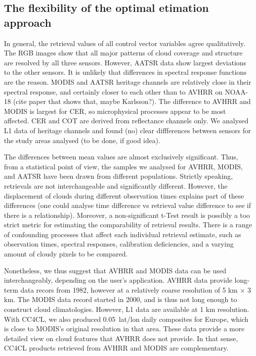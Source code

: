 \label{conclusions}

\subsection{The flexibility of the optimal etimation approach}


In general, the retrieval values of all control vector variables agree qualitatively. The RGB images show that all major patterns of cloud coverage and structure are resolved by all three sensors. However, AATSR data show largest deviations to the other sensors. It is unlikely that differences in spectral response functions are the reason. MODIS and AATSR heritage channels are relatively close in their spectral response, and certainly closer to each other than to AVHRR on NOAA-18 (cite paper that shows that, maybe Karlsson?). The difference to AVHRR and MODIS is largest for CER, so microphysical processes appear to be most affected. CER and COT are derived from reflectance channels only. We analysed L1 data of heritage channels and found (no) clear diffferences between sensors for the study areas analysed (to be done, if good idea).

The differences between mean values are almost exclusively significant. Thus, from a statistical point of view, the samples we analysed for AVHRR, MODIS, and AATSR have been drawn from different populations. Strictly speaking, retrievals are not interchangeable and significantly different. However, the displacement of clouds during different observation times explains part of these differences (one could analyse time difference vs retrieval value difference to see if there is a relationship). Moreover, a non-significant t-Test result is possibly a too strict metric for estimating the comparability of retrieval results. There is a range of confounding processes that affect each individual retrieval estimate, such as observation times, spectral responses, calibration deficiencies, and a varying amount of cloudy pixels to be compared.

Nonetheless, we thus suggest that AVHRR and MODIS data can be used interchangeably, depending on the user's application. AVHRR data provide long-term data recors from 1982, however at a relatively coarse resolution of 5 km $\times$ 3 km. The MODIS data record started in 2000, and is thus not long enough to construct cloud climatologies. However, L1 data are available at 1 km resolution. With CC4CL, we also produced 0.05\textdegree\ lat/lon daily composites for Europe, which is close to MODIS's original resolution in that area. These data provide a more detailed view on cloud features that AVHRR does not provide. In that sense, CC4CL products retrieved from AVHRR and MODIS are complementary.

